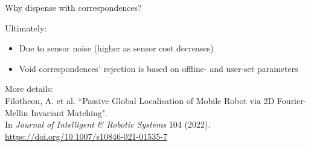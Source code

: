 \begin{frame}[noframenumbering]{Why dispense with correspondences?}

  Ultimately:
  \begin{itemize}
    \item Due to sensor noise (higher as sensor cost decreases)
    \item Void correspondences' rejection is based on offline- and user-set parameters
  \end{itemize}

  \vfill
  {\tiny
  More details: \\
  Filotheou, A. et al. ``Passive Global Localisation of Mobile Robot via 2D
  Fourier-Mellin Invariant Matching". \\ \vspace{-0.25cm}
  In \textit{Journal of Intelligent \& Robotic Systems} 104 (2022). \url{https://doi.org/10.1007/s10846-021-01535-7}}

\end{frame}
